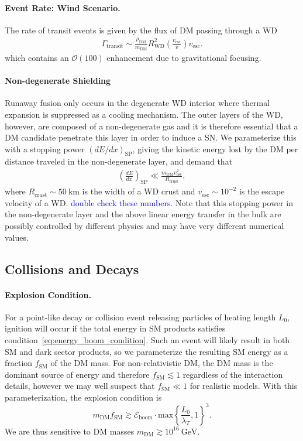 \documentclass[preprintnumbers,amsmath,amssymb,prd, superscriptaddress,twocolumn]{revtex4}
\newcommand{\Eboom}{\mathcal{E}_\text{boom}}
\newcommand{\OO}{\mathcal{O}}
\newcommand{\GeV}{\text{GeV}}
\def\r{\right)}
\def\l{\left(}
\begin{document}
\paragraph{Event Rate: Wind Scenario.}
The rate of transit events is given by the flux of DM passing through a WD
\begin{align}
  \Gamma_\text{transit} \sim
  \frac{\rho_{\text{DM}}}{m_\text{DM}} R_\text{WD}^2
  \l\frac{v_\text{esc}}{v}\r v_\text{esc}.
\label{eq:TransitFluxCondition}
\end{align}
which contains an $\OO(100)$ enhancement due to gravitational focusing.

\paragraph{Non-degenerate Shielding}
Runaway fusion only occurs in the degenerate WD interior where thermal expansion is suppressed as a cooling mechanism.
The outer layers of the WD, however, are composed of a non-degenerate gas and it is therefore essential that a DM candidate penetrate this layer in order to induce a SN.
We parameterize this with a stopping power $(dE/dx)_\text{SP}$, giving the kinetic energy lost by the DM per distance traveled in the non-degenerate layer, and demand that
\begin{align}
\label{eq:CrustCondition}
  \left( \frac{d E}{d x} \right)_\text{SP} \ll
  \frac{m_\text{DM} v^2_\text{esc}}{R_\text{crust}},
\end{align}
where $R_\text{crust} \sim 50 ~\text{km}$ is the width of a WD crust \cite{Chandrasekhar} and $v_\text{esc} \sim 10^{-2}$ is the escape velocity of a WD. \textcolor{blue}{double check these numbers}.
Note that this stopping power in the non-degenerate layer and the above linear energy transfer in the bulk are possibly controlled by different physics and may have very different numerical values.

\subsection{Collisions and Decays}

\paragraph{Explosion Condition.}
For a point-like decay or collision event releasing particles of heating length $L_0$, ignition will occur if the total energy in SM products satisfies condition~\eqref{eq:energy_boom_condition}.
Such an event will likely result in both SM and dark sector products, so we parameterize the resulting SM energy as a fraction $f_\text{SM}$ of the DM mass.
For non-relativistic DM, the DM mass is the dominant source of energy and therefore $f_\text{SM} \lesssim 1$ regardless of the interaction details, however we may well suspect that $f_\text{SM} \ll 1$ for realistic models.
With this parameterization, the explosion condition is
\begin{equation}
\label{eq:coldecay}
  m_\text{DM} f_\text{SM}  \gtrsim \Eboom \cdot \text{max} \left \{\frac{L_0}{\lambda_T}, 1 \right \}^3.
\end{equation}
We are thus sensitive to DM masses $m_\text{DM} \gtrsim 10^{16} ~\GeV$.
\end{document}
